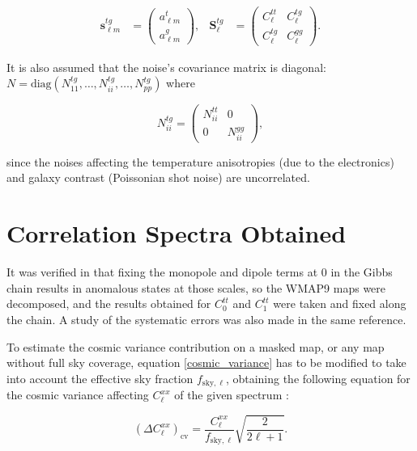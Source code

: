 \documentclass[openany,a4paper,12pt,oneside]{book}
\begin{document}
\begin{spacing}{1.5}
\begin{align}\label{s_lm=}
	\mathbf{s}_{\ell m}^{tg}&=
	\begin{pmatrix}
	a_{\ell m}^t\\
	a_{\ell m}^g
	\end{pmatrix}, &
	\mathbf{S}_\ell^{tg}&=
	\begin{pmatrix}
	C_\ell^{tt} & C_\ell^{tg}\\
	C_\ell^{tg} & C_\ell^{gg}
	\end{pmatrix}.
\end{align}

It is also assumed that the noise's covariance matrix is diagonal: $N=\text{diag}(N_{11}^{tg}, \dots, N_{ii}^{tg}, \dots, N_{pp}^{tg})$ where

\begin{equation}\label{Niitg}
	N_{ii}^{tg}=
	\begin{pmatrix}
	N_{ii}^{tt} & 0 \\
	0 & N_{ii}^{gg}
	\end{pmatrix},
\end{equation}

\noindent since the noises affecting the temperature anisotropies (due to the electronics) and galaxy contrast (Poissonian shot noise) are uncorrelated. 



\section{Correlation Spectra Obtained}

It was verified in \cite{Moura-Santos_2016} that fixing the monopole and dipole terms at 0 in the Gibbs chain results in anomalous states at those scales, so the WMAP9 maps were decomposed, and the results obtained for $C_0^{tt}$ and $C_1^{tt}$ were taken and fixed along the chain. A study of the systematic errors was also made in the same reference. 

To estimate the cosmic variance contribution on a masked map, or any map without full sky coverage, equation \eqref{cosmic_variance} has to be modified to take into account the effective sky fraction $f_{\text{sky},\ell}$, obtaining the following equation for the cosmic variance affecting $C_\ell^{xx}$ of the given spectrum \cite{wmap_supplement}: 

\begin{equation}\label{data_cosmic_variance}
	(\Delta C_\ell^{xx})_\text{cv}=\frac{C_\ell^{xx}}{f_{\text{sky},\ell}}\sqrt{\frac{2}{2\ell+1}}.
\end{equation}


\end{spacing}
\end{document}
